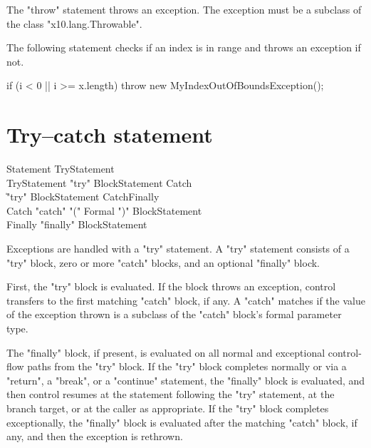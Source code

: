The \xcd"throw" statement throws an exception.  The exception
must be a subclass of the class \xcd"x10.lang.Throwable". 

\begin{example}
The following statement checks if an index is in range and
throws an exception if not.

\begin{xten}
if (i < 0 || i >= x.length)
    throw new MyIndexOutOfBoundsException();
\end{xten}
\end{example}

\section{Try--catch statement}

\begin{grammar}
Statement \: TryStatement \\
TryStatement \: \xcd"try" BlockStatement Catch\plus  \\
             \| \xcd"try" BlockStatement Catch\star Finally \\
Catch \: \xcd"catch" \xcd"(" Formal \xcd")" BlockStatement \\
Finally \: \xcd"finally" BlockStatement \\
\end{grammar}

Exceptions are handled with a \xcd"try" statement.
A \xcd"try" statement consists of a \xcd"try" block, zero or more
\xcd"catch" blocks, and an optional \xcd"finally" block.

First, the \xcd"try" block is evaluated.  If the block throws an
exception, control transfers to the first matching \xcd"catch"
block, if any.  A \xcd"catch" matches if the value of the
exception thrown is a subclass of the \xcd"catch" block's formal
parameter type.

The \xcd"finally" block, if present, is evaluated on all normal
and exceptional control-flow paths from the \xcd"try" block.
If the \xcd"try" block completes normally
or via a \xcd"return", a \xcd"break", or a
\xcd"continue" statement, 
the \xcd"finally"
block is evaluated, and then control resumes at
the statement following the \xcd"try" statement, at the branch target, or at
the caller as appropriate.
If the \xcd"try" block completes
exceptionally, the \xcd"finally" block is evaluated after the
matching \xcd"catch" block, if any, and then the
exception is rethrown.

